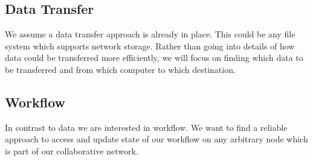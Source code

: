 \subsection{Data Transfer}
We assume a data transfer approach is already in place. This could be any file system which supports 
network storage. Rather than going into details of how data could be transferred more efficiently, we will
focus on finding which data to be transferred and from which computer to which destination.

\subsection{Workflow}
In contrast to data we are interested in workflow. We want to find a reliable approach to access and update 
state of our workflow on any arbitrary node which is part of our collaborative network.
